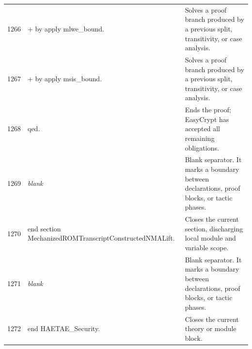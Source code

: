 \documentclass[10pt]{article}
\begin{document}
\begin{longtable}{r L{0.53\textwidth} L{0.37\textwidth}}
1266 & {\ttfamily\scriptsize + by apply mlwe\_bound.} & Solves a proof branch produced by a previous split, transitivity, or case analysis. \\
1267 & {\ttfamily\scriptsize + by apply msis\_bound.} & Solves a proof branch produced by a previous split, transitivity, or case analysis. \\
1268 & {\ttfamily\scriptsize qed.} & Ends the proof; EasyCrypt has accepted all remaining obligations. \\
1269 & {\ttfamily\scriptsize \emph{blank}} & Blank separator.  It marks a boundary between declarations, proof blocks, or tactic phases. \\
1270 & {\ttfamily\scriptsize end section MechanizedROMTranscriptConstructedNMALift.} & Closes the current section, discharging local module and variable scope. \\
1271 & {\ttfamily\scriptsize \emph{blank}} & Blank separator.  It marks a boundary between declarations, proof blocks, or tactic phases. \\
1272 & {\ttfamily\scriptsize end HAETAE\_Security.} & Closes the current theory or module block. \\
\bottomrule
\end{longtable}
\end{document}
